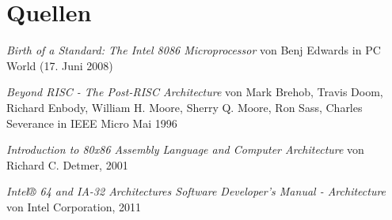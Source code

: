 \section{Quellen}

\begin{thebibliography}{9}

  \emph{Birth of a Standard: The Intel 8086 Microprocessor}
	von Benj Edwards
	in PC World (17. Juni 2008)

	\emph{Beyond RISC - The Post-RISC Architecture}
	von Mark Brehob, Travis Doom, Richard Enbody, William H. Moore, Sherry Q. Moore, Ron Sass, Charles Severance
	in IEEE Micro Mai 1996

	\emph{Introduction to 80x86 Assembly Language and Computer Architecture}
	von Richard C. Detmer,
	2001

	\emph{Intel® 64 and IA-32 Architectures Software Developer's Manual - Architecture}
	von Intel Corporation,
	2011
\end{thebibliography}
